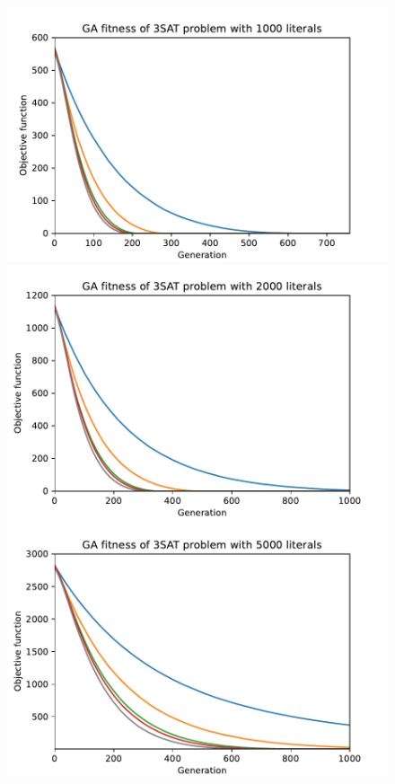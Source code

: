 \begin{figure}[ht!]
    \begin{minipage}[t]{0.32\textwidth}
        \centering
        \includegraphics[width=\textwidth]{img/runs/fitness_ga_3SAT_d1000.pdf}
    \end{minipage}
    \hfill
    \begin{minipage}[t]{0.32\textwidth}
        \centering
        \includegraphics[width=\textwidth]{img/runs/fitness_ga_3SAT_d2000.pdf}
    \end{minipage}
    \hfill
    \begin{minipage}[t]{0.32\textwidth}
        \centering
        \includegraphics[width=\textwidth]{img/runs/fitness_ga_3SAT_d5000.pdf}
    \end{minipage}


\end{figure}
